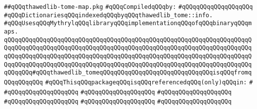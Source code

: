 \label{src/app/makelib/compilable/thawedlib-tome-map.pkg}
\verb|##qQQqthawedlib-tome-map.pkg|\newline
\newline
\verb|#qQQqCompiledqQQqby:|\newline
\verb|#qQQqqQQqqQQqqQQqqQQq|\newline
\newline
\newline
\newline
\verb|#qQQqDictionariesqQQqindexedqQQqbyqQQqthawedlib_tome::info.|\newline
\verb|#qQQqUsesqQQqMythrylqQQqlibraryqQQqimplementationqQQqofqQQqbinaryqQQqmaps.|\newline
\newline
\verb|qQQqqQQqqQQqqQQqqQQqqQQqqQQqqQQqqQQqqQQqqQQqqQQqqQQqqQQqqQQqqQQqqQQqqQQqqQQqqQQqqQQqqQQqqQQqqQQqqQQqqQQqqQQqqQQqqQQqqQQqqQQqqQQqqQQqqQQqqQQqqQQqqQQqqQQqqQQqqQQqqQQqqQQqqQQqqQQqqQQqqQQqqQQqqQQqqQQqqQQqqQQqqQQqqQQqqQQqqQQqqQQqqQQqqQQqqQQqqQQqqQQqqQQqqQQqqQQqqQQqqQQqqQQqqQQqqQQqqQQqqQQqqQQq#qQQqthawedlib_tomeqQQqqQQqqQQqqQQqqQQqqQQqqQQqqQQqisqQQqfromqQQqqQQqqQQq|\newline
\verb|#qQQqThisqQQqpackageqQQqisqQQqreferencedqQQq(only)qQQqin:|\newline
\verb|#|\newline
\verb|#qQQqqQQqqQQqqQQqqQQq|\newline
\verb|#qQQqqQQqqQQqqQQqqQQq|\newline
\verb|#qQQqqQQqqQQqqQQqqQQq|\newline
\verb|#qQQqqQQqqQQqqQQqqQQq|\newline
\verb|#qQQqqQQqqQQqqQQqqQQq|\newline
\verb|#qQQqqQQqqQQqqQQqqQQq|\newline
